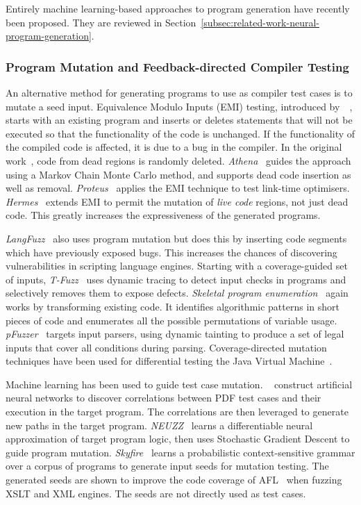 Entirely machine learning-based approaches to program generation have recently been proposed. They are reviewed in Section~\ref{subsec:related-work-neural-program-generation}.


\subsubsection{Program Mutation and Feedback-directed Compiler Testing}

An alternative method for generating programs to use as compiler test cases is to mutate a seed input. Equivalence Modulo Inputs (EMI) testing, introduced by~\citeauthor{Le2013a}~\cite{Le2013a}, starts with an existing program and inserts or deletes statements that will not be executed so that the functionality of the code is unchanged. If the functionality of the compiled code is affected, it is due to a bug in the compiler. In the original work~\cite{Le2013a}, code from dead regions is randomly deleted. \emph{Athena}~\cite{Le2015} guides the approach using a Markov Chain Monte Carlo method, and supports dead code insertion as well as removal. \emph{Proteus}~\cite{Le2015b} applies the EMI technique to test link-time optimisers. \emph{Hermes}~\cite{Sun2016a} extends EMI to permit the mutation of \emph{live code} regions, not just dead code. This greatly increases the expressiveness of the generated programs.

\emph{LangFuzz}~\cite{Holler2012} also uses program mutation but does this by inserting code segments which have previously exposed bugs. This increases the chances of discovering vulnerabilities in scripting language engines. Starting with a coverage-guided set of inputs, \emph{T-Fuzz}~\cite{Peng2018} uses dynamic tracing to detect input checks in programs and selectively removes them to expose defects. \emph{Skeletal program enumeration}~\cite{Zhang2017a} again works by transforming existing code. It identifies algorithmic patterns in short pieces of code and enumerates all the possible permutations of variable usage. \emph{pFuzzer}~\cite{Mathis2019} targets input parsers, using dynamic tainting to produce a set of legal inputs that cover all conditions during parsing. Coverage-directed mutation techniques have been used for differential testing the Java Virtual Machine~\cite{Chen2016b}.

Machine learning has been used to guide test case mutation. \citeauthor{Cheng2019}~\cite{Cheng2019} construct artificial neural networks to discover correlations between PDF test cases and their execution in the target program. The correlations are then leveraged to generate new paths in the target program. \emph{NEUZZ}~\cite{She2018} learns a differentiable neural approximation of target program logic, then uses Stochastic Gradient Descent to guide program mutation. \emph{Skyfire}~\cite{Wang2017c} learns a probabilistic context-sensitive grammar over a corpus of programs to generate input seeds for mutation testing. The generated seeds are shown to improve the code coverage of AFL~\cite{Zalewski} when fuzzing XSLT and XML engines. The seeds are not directly used as test cases.

